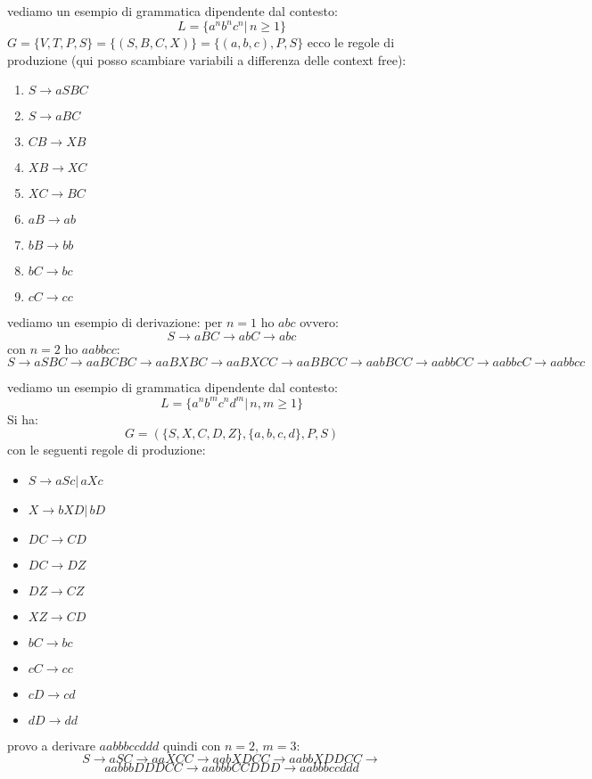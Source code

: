 \begin{example}
	vediamo un esempio di grammatica dipendente dal contesto:
	$$L=\{a^nb^nc^n|\, n\geq 1\}$$
	$G=\{V,T,P,S\}=\{(S,B,C,X)\}=\{(a,b,c),P,S\}$
	ecco le regole di produzione (qui posso scambiare variabili a differenza delle context free):
	\begin{enumerate}
		\item $S\to aSBC$
		\item $S\to aBC$
		\item $CB\to XB$
		\item $XB\to XC$
		\item $XC\to BC$
		\item $aB\to ab$
		\item $bB\to bb$
		\item $bC\to bc$
		\item $cC\to cc$
	\end{enumerate}
	vediamo un esempio di derivazione:
	per $n=1$ ho $abc$ ovvero:
	$$S\to aBC\to abC\to abc$$
	con $n=2$ ho $aabbcc$:
	$S\to aSBC\to aaBCBC\to aaBXBC\to aaBXCC\to aaBBCC\to aabBCC\to aabbCC\to aabbcC\to aabbcc$\\
\end{example}
\newpage
\begin{example}
	vediamo un esempio di grammatica dipendente dal contesto:
	$$L=\{a^nb^mc^nd^m|\, n,m\geq 1\}$$
	Si ha:
	$$G=(\{S,X,C,D,Z\},\{a,b,c,d\},P,S)$$
	con le seguenti regole di produzione:
	\begin{itemize}
		\item $S\to aSc|\, aXc$
		\item $X\to bXD|\, bD$
		\item $DC\to CD$
		\item $DC\to DZ$
		\item $DZ\to CZ$
		\item $XZ\to CD$
		\item $bC\to bc$
		\item $cC\to cc$
		\item $cD\to cd$
		\item $dD\to dd$
	\end{itemize}
	provo a derivare $aabbbccddd$ quindi con $n=2,\,m=3$:\\
	$$S\to aSC\to aaXCC\to aabXDCC\to aabbXDDCC\to $$
	$$aabbbDDDCC\to aabbbCCDDD\to aabbbccddd$$
\end{example}

